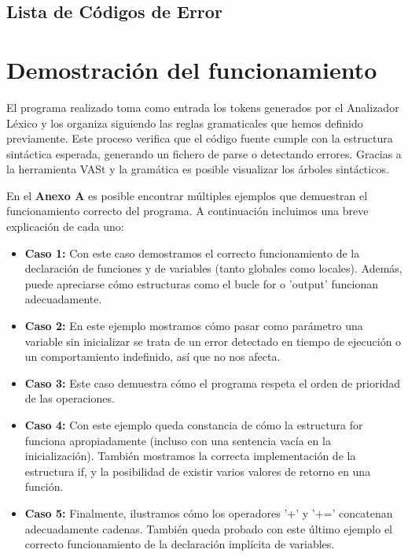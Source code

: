 \documentclass{article}
\begin{document}
\subsection*{Lista de Códigos de Error}








\section{Demostración del funcionamiento}
El programa realizado toma como entrada los tokens generados por el Analizador Léxico y los organiza siguiendo las reglas gramaticales que hemos definido previamente. Este proceso verifica que el código fuente cumple con la estructura sintáctica esperada, generando un fichero de parse o detectando errores. Gracias a la herramienta VASt y la gramática es posible visualizar los árboles sintácticos.

En el \textbf{Anexo A} es posible encontrar múltiples ejemplos que demuestran el funcionamiento correcto del programa. A continuación incluimos una breve explicación de cada uno:

\begin{itemize}
    \item \textbf{Caso 1:} Con este caso demostramos el correcto funcionamiento de la declaración de funciones y de variables (tanto globales como locales). Además, puede apreciarse cómo estructuras como el bucle for o 'output' funcionan adecuadamente.

    \item \textbf{Caso 2:} En este ejemplo mostramos cómo pasar como parámetro una variable sin inicializar se trata de un error detectado en tiempo de ejecución o un comportamiento indefinido, así que no nos afecta.
    
    \item \textbf{Caso 3:} Este caso demuestra cómo el programa respeta el orden de prioridad de las operaciones.
    
    \item \textbf{Caso 4:} Con este ejemplo queda constancia de cómo la estructura for funciona apropiadamente (incluso con una sentencia vacía en la inicialización). También mostramos la correcta implementación de la estructura if, y la posibilidad de existir varios valores de retorno en una función.
    
    \item \textbf{Caso 5:} Finalmente, ilustramos cómo los operadores '+' y '+=' concatenan adecuadamente cadenas. También queda probado con este último ejemplo el correcto funcionamiento de la declaración implícita de variables.
\end{itemize}
\end{document}
